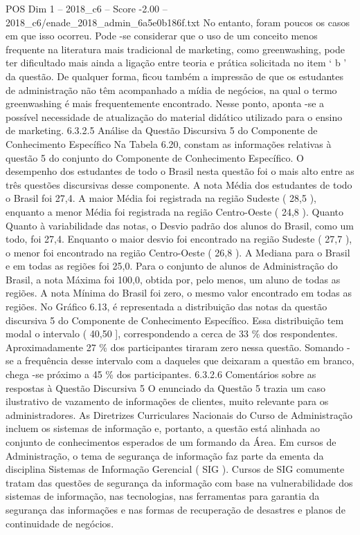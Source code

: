 \begin{textsample}{POS Dim 1 – 2018\_c6 – Score -2.00 – 2018\_c6/enade\_2018\_admin\_6a5e0b186f.txt}
No entanto, foram poucos os casos em que isso ocorreu.
Pode -se considerar que o uso de um conceito menos frequente na literatura mais tradicional de marketing, como greenwashing, pode ter dificultado mais ainda a ligação entre teoria e prática solicitada no item ‘ b ’ da questão.
De qualquer forma, ficou também a impressão de que os estudantes de administração não têm acompanhado a mídia de negócios, na qual o termo greenwashing é mais frequentemente encontrado.
Nesse ponto, aponta -se a possível necessidade de atualização do material didático utilizado para o ensino de marketing. 6.3.2.5 Análise da Questão Discursiva 5 do Componente de Conhecimento Específico Na Tabela 6.20, constam as informações relativas à questão 5 do conjunto do Componente de Conhecimento Específico.
O desempenho dos estudantes de todo o Brasil nesta questão foi o mais alto entre as três questões discursivas desse componente.
A nota Média dos estudantes de todo o Brasil foi 27,4.
A maior Média foi registrada na região Sudeste ( 28,5 ), enquanto a menor Média foi registrada na região Centro-Oeste ( 24,8 ).
Quanto Quanto à variabilidade das notas, o Desvio padrão dos alunos do Brasil, como um todo, foi 27,4.
Enquanto o maior desvio foi encontrado na região Sudeste ( 27,7 ), o menor foi encontrado na região Centro-Oeste ( 26,8 ).
A Mediana para o Brasil e em todas as regiões foi 25,0.
Para o conjunto de alunos de Administração do Brasil, a nota Máxima foi 100,0, obtida por, pelo menos, um aluno de todas as regiões.
A nota Mínima do Brasil foi zero, o mesmo valor encontrado em todas as regiões.
No Gráfico 6.13, é representada a distribuição das notas da questão discursiva 5 do Componente de Conhecimento Específico.
Essa distribuição tem modal o intervalo ( 40,50 ], correspondendo a cerca de 33 \% dos respondentes.
Aproximadamente 27 \% dos participantes tiraram zero nessa questão.
Somando -se a frequência desse intervalo com a daqueles que deixaram a questão em branco, chega -se próximo a 45 \% dos participantes. 6.3.2.6 Comentários sobre as respostas à Questão Discursiva 5 O enunciado da Questão 5 trazia um caso ilustrativo de vazamento de informações de clientes, muito relevante para os administradores.
As Diretrizes Curriculares Nacionais do Curso de Administração incluem os sistemas de informação e, portanto, a questão está alinhada ao conjunto de conhecimentos esperados de um formando da Área.
Em cursos de Administração, o tema de segurança de informação faz parte da ementa da disciplina Sistemas de Informação Gerencial ( SIG ).
Cursos de SIG comumente tratam das questões de segurança da informação com base na vulnerabilidade dos sistemas de informação, nas tecnologias, nas ferramentas para garantia da segurança das informações e nas formas de recuperação de desastres e planos de continuidade de negócios.

\end{textsample}
